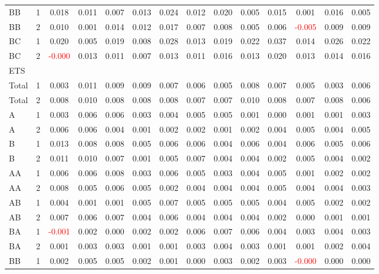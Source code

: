 \begin{table}[!htb]
{\begin{tabular}{llcccccccccccc}
BB & 1 & 0.018 & 0.011 & 0.007 & 0.013 & 0.024 & 0.012 & 0.020 & 0.005 & 0.015 & 0.001 & 0.016 & 0.005\\
BB & 2 & 0.010 & 0.001 & 0.014 & 0.012 & 0.017 & 0.007 & 0.008 & 0.005 & 0.006 & \textcolor{red}{-0.005} & 0.009 & 0.009\\
BC & 1 & 0.020 & 0.005 & 0.019 & 0.008 & 0.028 & 0.013 & 0.019 & 0.022 & 0.037 & 0.014 & 0.026 & 0.022\\
BC & 2 & \textcolor{red}{-0.000} & 0.013 & 0.011 & 0.007 & 0.013 & 0.011 & 0.016 & 0.013 & 0.020 & 0.013 & 0.014 & 0.016\\
\hline
ETS &  &  &  &  &  &  &  &  &  &  &  &  & \\
\hline
Total & 1 & 0.003 & 0.011 & 0.009 & 0.009 & 0.007 & 0.006 & 0.005 & 0.008 & 0.007 & 0.005 & 0.003 & 0.006\\
Total & 2 & 0.008 & 0.010 & 0.008 & 0.008 & 0.008 & 0.007 & 0.007 & 0.010 & 0.008 & 0.007 & 0.008 & 0.006\\
A & 1 & 0.003 & 0.006 & 0.006 & 0.003 & 0.004 & 0.005 & 0.005 & 0.001 & 0.000 & 0.001 & 0.001 & 0.003\\
A & 2 & 0.006 & 0.006 & 0.004 & 0.001 & 0.002 & 0.002 & 0.001 & 0.002 & 0.004 & 0.005 & 0.004 & 0.005\\
B & 1 & 0.013 & 0.008 & 0.008 & 0.005 & 0.006 & 0.006 & 0.004 & 0.006 & 0.004 & 0.006 & 0.005 & 0.006\\
B & 2 & 0.011 & 0.010 & 0.007 & 0.001 & 0.005 & 0.007 & 0.004 & 0.004 & 0.002 & 0.005 & 0.004 & 0.002\\
AA & 1 & 0.006 & 0.006 & 0.008 & 0.003 & 0.006 & 0.005 & 0.003 & 0.004 & 0.005 & 0.001 & 0.002 & 0.002\\
AA & 2 & 0.008 & 0.005 & 0.006 & 0.005 & 0.002 & 0.004 & 0.004 & 0.004 & 0.005 & 0.004 & 0.004 & 0.003\\
AB & 1 & 0.004 & 0.001 & 0.001 & 0.005 & 0.007 & 0.005 & 0.005 & 0.005 & 0.004 & 0.005 & 0.002 & 0.002\\
AB & 2 & 0.007 & 0.006 & 0.007 & 0.004 & 0.006 & 0.004 & 0.004 & 0.004 & 0.002 & 0.000 & 0.001 & 0.001\\
BA & 1 & \textcolor{red}{-0.001} & 0.002 & 0.000 & 0.002 & 0.002 & 0.006 & 0.007 & 0.006 & 0.004 & 0.003 & 0.004 & 0.003\\
BA & 2 & 0.001 & 0.003 & 0.003 & 0.001 & 0.001 & 0.003 & 0.004 & 0.003 & 0.001 & 0.001 & 0.002 & 0.004\\
BB & 1 & 0.002 & 0.005 & 0.005 & 0.002 & 0.001 & 0.000 & 0.003 & 0.002 & 0.003 & \textcolor{red}{-0.000} & 0.000 & 0.000\\

\end{tabular}}
\end{table}
